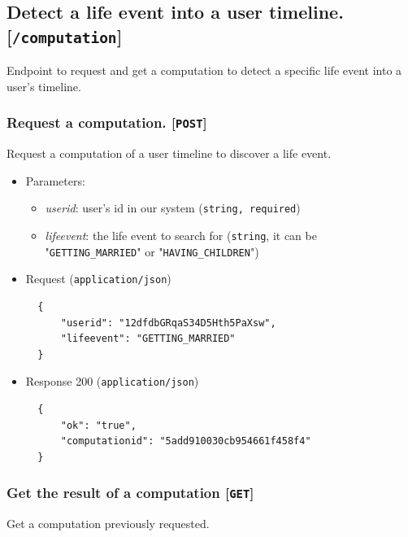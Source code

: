 \subsection{Detect a life event into a user timeline. {[}\protect\texttt{/computation}{]}}
\label{sec:APIcomputation}

Endpoint to request and get a computation to detect a specific life event into a user's timeline.

\subsubsection{Request a computation. {[}\protect\texttt{POST}{]}}

Request a computation of a user timeline to discover a life event.

\begin{itemize}
\item
  Parameters:

  \begin{itemize}
  \item
    \textit{userid}: user's id in our system (\texttt{string, required})
  \item
    \textit{lifeevent}: the life event to search for (\texttt{string}, it can be "\texttt{GETTING\_MARRIED}" or "\texttt{HAVING\_CHILDREN}")
  \end{itemize}
\item
  Request (\texttt{application/json})

\begin{verbatim}
  {
      "userid": "12dfdbGRqaS34D5Hth5PaXsw",
      "lifeevent": "GETTING_MARRIED"
  }
\end{verbatim}
\item
  Response 200 (\texttt{application/json})

\begin{verbatim}
  {
      "ok": "true",
      "computationid": "5add910030cb954661f458f4"
  }
\end{verbatim}
\end{itemize}

\subsubsection{Get the result of a computation {[}\protect\texttt{GET}{]}}

Get a computation previously requested.

